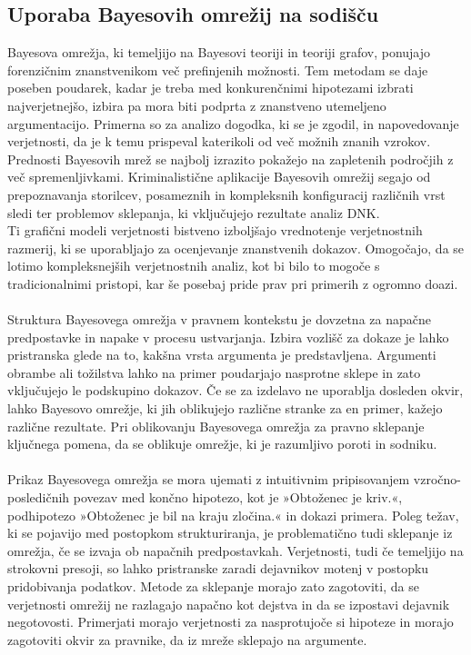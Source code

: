 \documentclass[mat1, tisk]{fmfdelo}
\theoremstyle{definition} %
\theoremstyle{trditev} %
\theoremstyle{izrek}
\begin{document}
\subsection{Uporaba Bayesovih omrežij na sodišču}
Bayesova omrežja, ki temeljijo na Bayesovi teoriji in teoriji grafov, ponujajo forenzičnim znanstvenikom več prefinjenih možnosti. Tem metodam
se daje poseben poudarek, kadar je treba med konkurenčnimi hipotezami izbrati najverjetnejšo, izbira pa mora biti podprta z znanstveno utemeljeno
argumentacijo. Primerna so za analizo dogodka, ki se je zgodil, in napovedovanje verjetnosti, da je k temu prispeval katerikoli od več možnih
znanih vzrokov. Prednosti Bayesovih mrež se najbolj izrazito pokažejo na zapletenih področjih z več spremenljivkami. Kriminalistične aplikacije
Bayesovih omrežij segajo od prepoznavanja storilcev, posameznih in kompleksnih konfiguracij različnih vrst sledi ter problemov sklepanja, ki
vključujejo rezultate analiz DNK.\\
Ti grafični modeli verjetnosti bistveno izboljšajo vrednotenje verjetnostnih razmerij, ki se uporabljajo za ocenjevanje znanstvenih dokazov.
Omogočajo, da se lotimo kompleksnejših verjetnostnih analiz, kot bi bilo to mogoče s tradicionalnimi pristopi, kar še posebaj pride prav pri primerih z ogromno doazi. \\\\
Struktura Bayesovega omrežja v pravnem kontekstu je dovzetna za napačne predpostavke in napake v procesu ustvarjanja. Izbira vozlišč za dokaze je lahko
pristranska glede na to, kakšna vrsta argumenta je predstavljena. Argumenti obrambe ali tožilstva lahko na primer poudarjajo nasprotne sklepe
in zato vključujejo le podskupino dokazov. Če se za izdelavo ne uporablja dosleden okvir, lahko Bayesovo omrežje, ki jih oblikujejo različne stranke za en
primer, kažejo različne rezultate. Pri oblikovanju Bayesovega omrežja za pravno sklepanje ključnega pomena, da se oblikuje omrežje, ki je razumljivo poroti
in sodniku.\\\\
Prikaz Bayesovega omrežja se mora ujemati z intuitivnim pripisovanjem vzročno-posledičnih povezav med končno hipotezo, kot je »Obtoženec je kriv.«, podhipotezo
»Obtoženec je bil na kraju zločina.« in dokazi primera. Poleg težav, ki se pojavijo med postopkom strukturiranja, je problematično tudi sklepanje
iz omrežja, če se izvaja ob napačnih predpostavkah. Verjetnosti, tudi če temeljijo na strokovni presoji, so lahko pristranske zaradi dejavnikov
motenj v postopku pridobivanja podatkov. Metode za sklepanje morajo zato zagotoviti, da se verjetnosti omrežij ne razlagajo napačno kot dejstva in
da se izpostavi dejavnik negotovosti. Primerjati morajo verjetnosti za nasprotujoče si hipoteze in morajo zagotoviti okvir za pravnike, da iz
mreže sklepajo na argumente.
\end{document}
